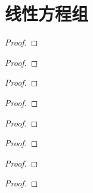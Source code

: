 \section{线性方程组}

\setcounter{problem}{3}
\begin{problem}
\end{problem}
\begin{proof}

\end{proof}

\begin{problem}
\end{problem}
\begin{proof}

\end{proof}

\begin{problem}
\end{problem}
\begin{proof}

\end{proof}

\begin{problem}
\end{problem}
\begin{proof}

\end{proof}

\begin{problem}
\end{problem}
\begin{proof}

\end{proof}

\setcounter{problem}{13}
\begin{problem}
\end{problem}
\begin{proof}

\end{proof}

\begin{problem}
\end{problem}
\begin{proof}

\end{proof}

\setcounter{problem}{20}
\begin{problem}
\end{problem}
\begin{proof}

\end{proof}

